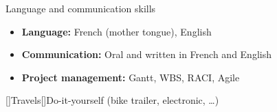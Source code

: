 \documentclass[11pt,a4paper,sans]{moderncv}        %
\newcommand{\myitem}{\textbullet}
\begin{document}
\begin{samepage}
{}%
{Language and communication skills}%
{{%
	\begin{itemize}[label=\myitem]%
	\item \textbf{Language: } {\small French (mother tongue),  English}%
	\item \textbf{Communication: } {\small Oral and written in French and English} %
	\item \textbf{Project management: } {\small Gantt, WBS, RACI, Agile}%
	\end{itemize}%
}}%
\vspace*{-4mm}%
[\bcfleur]{Travels}[\bcvelo]{Do-it-yourself (bike trailer, electronic, …)}%
\end{samepage}%
\end{document}
